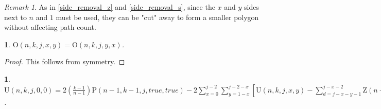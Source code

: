 \documentclass[a4paper, 12pt] {article}
\theoremstyle{remark}
\newtheorem*{remark}{Remark}
\theoremstyle{plain}
\newcommand{\thistheoremname}{}
\newtheorem{genericthm}[theorem]{\thistheoremname}
\newenvironment{namedthm}[1]
  {\renewcommand{\thistheoremname}{#1}
   \begin{genericthm}}
  {\end{genericthm}}
\theoremstyle{remark}
\begin{document}
\begin{remark}
As in \ref{side_removal_z} and \ref{side_removal_s}, since the $x$ and $y$ sides next to $n$ and $1$ must be used, they can be "cut" away to form a smaller polygon without affecting path count.
\end{remark}


\begin{namedthm}{Symmetry Theorem O}
\label{symmetry_o}
$\mathrm{O}(n,k,j,x,y)=\mathrm{O}(n,k,j,y,x)$.
\end{namedthm}

\begin{proof}
This follows from symmetry.
\end{proof}


\begin{namedthm}{Vertex Merge Theorem U}
\label{vertex_merge_u}
$\mathrm{U}(n,k,j,0,0)=2\left(\frac{k-1}{n-1}\right)\mathrm{P}(n-1,k-1,j,true,true)-2\sum_{x=0}^{j-2} \sum_{y=1-x}^{j-2-x} [\mathrm{U}(n,k,j,x,y)-\sum_{d=j-x-y-1}^{j-x-2} \mathrm{Z}(n-x-1,k-x-1,j,y,d-1)-\sum_{d=j-x-y-1}^{j-y-2} \mathrm{Z}(n-y-1,k-y-1,j,x,d-1)]+\sum_{x=0}^{j-1} \sum_{y=1-x}^{j-1} [\mathrm{U}\allowbreak(n-x-y,k-x-y,j,0,0)+\sum_{d=j-1}^{j-1-x} \mathrm{Z}(n-y-1,k-y-1,j,0,d-1)+\sum_{d=j-1}^{j-1-y} \mathrm{Z}(n-x-1,k-x-1,j,0,d-1)-\sum_{d=j-x}^{j-2} \mathrm{Z}(n-x-y-1,k-x-y-1,j,0,d-1)-\sum_{d=j-y}^{j-2} \mathrm{Z}(n-x-y-1,k-x-y-1,j,0,d-1)]+2\mathrm{Z}(n-1,k-1,j,0,j-2)$.
\end{namedthm}
\end{document}
